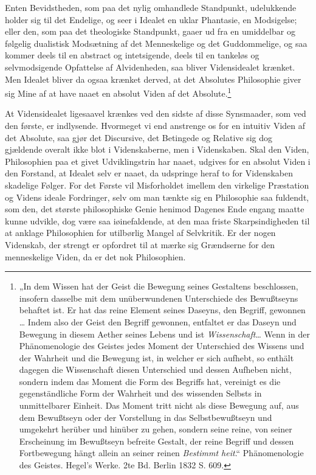 \documentclass[11pt]{book}
\newcommand{\opage}[1]{\marginnote{\footnotesize\textit{[#1]}}}
\begin{document}
Enten Bevidstheden, som paa det nylig omhandlede Standpunkt,
udelukkende holder sig til det Endelige, og seer i Idealet en uklar
Phantasie, en Modsigelse; eller den, som paa det theologiske
Standpunkt, gaaer ud fra en umiddelbar og følgelig dualistisk
Modsætning af det Menneskelige og det Guddommelige, og saa kommer deels
til en abstract og intetsigende, deels til en tankeløs og
selvmodsigende Opfattelse af Alvidenheden, saa bliver Vidensidealet
krænket. Men Idealet bliver da ogsaa krænket derved, at det Absolutes
Philosophie giver sig Mine af at have naaet en absolut Viden af det
Absolute.\footnote{%
„In dem Wissen hat der Geist die Bewegung seines Gestaltens
beschlossen, insofern dasselbe mit dem unüberwundenen Unterschiede des
Bewußtseyns behaftet ist. Er hat das reine Element seines Daseyns, den
Begriff, gewonnen \ldots{} Indem also der Geist den Begriff gewonnen,
entfaltet er das Daseyn und Bewegung in diesem
Aether seines Lebens und ist \emph{Wissenschaft}\ldots{} Wenn in der
Phänomenologie des Geistes jedes Moment der Unterschied des Wissens und
der Wahrheit und die Bewegung ist, in welcher er sich aufhebt, so
enthält dagegen die Wissenschaft diesen Unterschied und dessen Aufheben
nicht, sondern indem das Moment die Form des Begriffs hat, vereinigt es
die gegenständliche Form der Wahrheit und des wissenden Selbsts in
unmittelbarer Einheit. Das Moment tritt nicht als diese Bewegung auf,
aus dem Bewußtseyn oder der Vorstellung in das Selbstbewußtseyn und
umgekehrt herüber und hinüber zu gehen, sondern seine reine, von seiner
Erscheinung im Bewußtseyn befreite Gestalt, der reine Begriff und
dessen Fortbewegung hängt allein an seiner reinen \emph{Bestimmt\-%
heit}.“ Phänomenologie des Geistes. Hegel's Werke. 2te Bd. Berlin 1832
S. 609.}

\opage{252} \setcounter{footnote}{0}%
At Vidensidealet ligesaavel krænkes ved den sidste af disse
Synsmaader, som ved den første, er indlysende. Hvormeget vi end
anstrenge os for en intuitiv Viden af det Absolute, saa gjør det
Discursive, det Betingede og Relative sig dog gjældende overalt ikke
blot i Videnskaberne, men i Videnskaben. Skal den Viden, Philosophien
paa et givet Udviklingstrin har naaet, udgives for en absolut Viden i
den Forstand, at Idealet selv er naaet, da udspringe heraf to for
Videnskaben skadelige Følger. For det Første vil Misforholdet imellem
den virkelige Præstation og Videns ideale Fordringer, selv om man
tænkte sig en Philosophie saa fuldendt, som den, det største
philosophiske Genie henimod Dagenes Ende engang maatte kunne udvikle,
dog være saa iøinefaldende, at den maa friste Skarpsindigheden til at
anklage Philosophien for utilbørlig Mangel af Selvkritik. Er der nogen
Videnskab, der strengt er opfordret til at mærke sig Grændserne for den
menneskelige Viden, da er det nok Philosophien.
\end{document}

